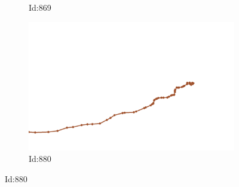 \documentclass[12pt,twoside]{report}
\begin{document}
\begin{figure}
\begin{subfigure}[b]{0.20\textwidth}
\caption{Id:869}
\end{subfigure}
\begin{subfigure}[b]{0.20\textwidth}
\centering
\includegraphics[width=\textwidth]{../../trajectories/880.png}
\caption{Id:880}
\end{subfigure}
\end{figure}
\end{document}
